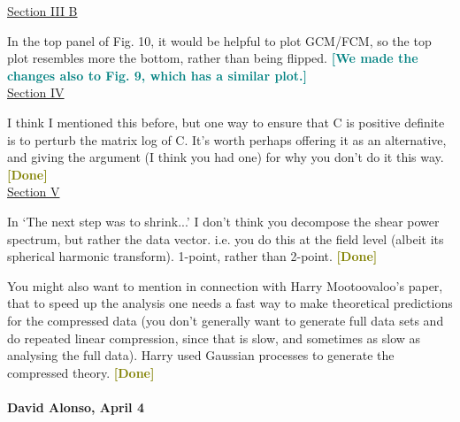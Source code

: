 \documentclass{article}
\newcommand\reply[1]{{\bf {\textcolor{teal}{[#1]}}}}
\newcommand\done{{\bf {\textcolor{olive}{[Done]}}}}
\begin{document}
	\underline{Section III B}
	
	In the top panel of Fig. 10, it would be helpful to plot GCM/FCM, so the top plot resembles more the bottom, rather than being flipped. \reply{We made the changes also to Fig. 9, which has a similar plot.}\\
	
	\underline{Section IV}
	
	I think I mentioned this before, but one way to ensure that C is positive definite is to perturb the matrix log of C.  It’s worth perhaps offering it as an alternative, and giving the argument (I think you had one) for why you don’t do it this way. \done \\
	
	\underline{Section V}
	
	In ‘The next step was to shrink...’ I don’t think you decompose the shear power spectrum, but rather the data vector.  i.e. you do this at the field level (albeit its spherical harmonic transform).  1-point, rather than 2-point. \done
	
	You might also want to mention in connection with Harry Mootoovaloo’s paper, that to speed up the analysis one needs a fast way to make theoretical predictions for the compressed data (you don’t generally want to generate full data sets and do repeated linear compression, since that is slow, and sometimes as slow as analysing the full data).  Harry used Gaussian processes to generate the compressed theory. \done \\  \\
	
	
	\textbf{David Alonso, April 4} \\
	
\end{document}

